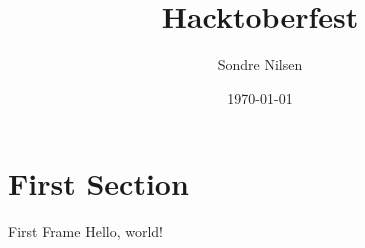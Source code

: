 \documentclass{beamer}
\title{Hacktoberfest}
\date{\today}
\author{Sondre Nilsen}
\institute{echo makerspace}
\begin{document}
  \maketitle
  \section{First Section}
  \begin{frame}{First Frame}
    Hello, world!
  \end{frame}
\end{document}
